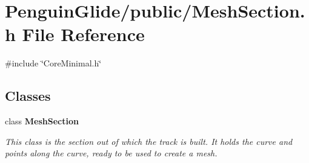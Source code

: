 \section{Penguin\+Glide/public/\+Mesh\+Section.h File Reference}
\label{_mesh_section_8h}
{\ttfamily \#include \char`\"{}Core\+Minimal.\+h\char`\"{}}\newline
\subsection*{Classes}
\begin{DoxyCompactItemize}
\item 
class \textbf{ Mesh\+Section}
\begin{DoxyCompactList}\small\item\em This class is the section out of which the track is built. It holds the curve and points along the curve, ready to be used to create a mesh. \end{DoxyCompactList}\end{DoxyCompactItemize}
